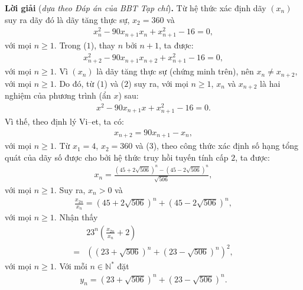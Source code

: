 \begin{multicols}{2}
	\vskip 0.05cm
	\textbf{\color{thachthuctoanhoc}Lời giải} (\textit{dựa theo Đáp án của BBT Tạp chí})\textbf{\color{thachthuctoanhoc}.}
	\vskip 0.05cm
	Từ hệ thức xác định dãy $(x_n)$  suy ra dãy đó là dãy tăng thực sự, $x_2 = 360$  và
	\begin{align*}
		x_n^2 - 90{x_{n + 1}}{x_n} + x_{n + 1}^2 - 16 = 0, \tag{$1$}
	\end{align*}
	với mọi $n \ge 1$.
	\vskip 0.05cm
	Trong ($1$), thay $n$ bởi $n + 1$, ta được:
	\begin{align*}
		x_{n + 2}^2 - 90{x_{n + 1}}{x_{n + 2}} + x_{n + 1}^2 - 16 = 0, \tag{$2$}
	\end{align*}
	với mọi $n \ge 1$.
	\vskip 0.05cm
	Vì $(x_n)$  là dãy tăng thực sự (chứng minh trên), nên ${x_n} \ne {x_{n + 2}},$ với mọi $n \ge 1$. Do đó, từ ($1$) và ($2$) suy ra, với mọi $n \ge 1$, $x_n$  và $x_{n+2}$  là hai nghiệm của phương trình (ẩn $x$) sau:
	\begin{align*}
		{x^2} - 90{x_{n + 1}}x + x_{n + 1}^2 - 16 = 0.
	\end{align*}
	Vì thế, theo định lý Vi--et, ta có:
	\begin{align*}
		{x_{n + 2}} = 90{x_{n + 1}} - {x_n}, \tag{$3$}
	\end{align*}
	với mọi $n \ge 1$.
	\vskip 0.05cm
	Từ $x_1 = 4$, $x_2 = 360$ và ($3$), theo công thức xác định số hạng tổng quát của dãy số được cho bởi hệ thức truy hồi tuyến tính cấp $2$, ta được:
	\begin{align*}
		{x_n} = \frac{{{{\left( {45 + 2\sqrt {506} } \right)}^n} - {{\left( {45 - 2\sqrt {506} } \right)}^n}}}{{\sqrt {506} }},
	\end{align*}
	với mọi $n \ge 1$.
	\vskip 0.05cm
	Suy ra, $x_n > 0$  và
	\begin{align*}
		\frac{{{x_{2n}}}}{{{x_n}}} = {\left( {45 + 2\sqrt {506} } \right)^n} + {\left( {45 - 2\sqrt {506} } \right)^n},
	\end{align*}
	với mọi $n \ge 1$.
	\vskip 0.05cm
	Nhận thấy
	\begin{align*}
		&{23^n}\left( {\frac{{{x_{2n}}}}{{{x_n}}} + 2} \right) \\
		= &{\left( {{{\left( {23 + \sqrt {506} } \right)}^n} + {{\left( {23 - \sqrt {506} } \right)}^n}} \right)^2},
	\end{align*}
	với mọi $n \ge 1$.
	\vskip 0.05cm
	Với mỗi $n \in \mathbb{N^*}$  đặt
	\begin{align*}
		{y_n} = {\left( {23 + \sqrt {506} } \right)^n} + {\left( {23 - \sqrt {506} } \right)^n}.
	\end{align*}

\end{multicols}
